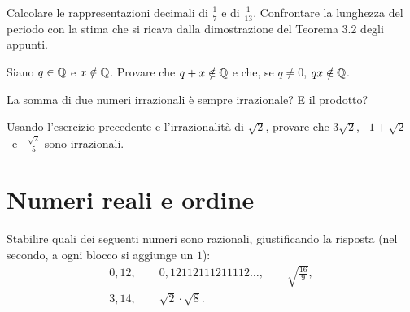 \begin{esercizio}[\liv{2}]
Calcolare le rappresentazioni decimali di $\frac17$ e di $\frac{1}{13}$. Confrontare la lunghezza del periodo con la stima che si ricava dalla dimostrazione del Teorema 3.2 degli appunti.
\end{esercizio}

\begin{esercizio}[\liv{2}]
Siano $q\in\mathbb Q$ e $x\notin\mathbb Q$. Provare che $q+x\notin\mathbb Q$ e che, se $q\ne0$, $qx\notin\mathbb Q$.
\end{esercizio}

\begin{esercizio}[\liv{2}]
La somma di due numeri irrazionali \`e sempre irrazionale? E il prodotto?
\end{esercizio}

\begin{esercizio}[\liv{2}]
Usando l'esercizio precedente e l'irrazionalità di $\sqrt2$, provare che $3\sqrt2$, \ $1+\sqrt2$ \ e \ $\frac{\sqrt2}{5}$ sono irrazionali.
\end{esercizio}

\section{Numeri reali e ordine}

\begin{esercizio}[\liv{1}]
Stabilire quali dei seguenti numeri sono razionali, giustificando la risposta (nel secondo, a ogni blocco si aggiunge un $1$):
\begin{gather*}
0{,}\overline{12},\qquad 0{,}12112111211112\ldots,\qquad \sqrt{\tfrac{16}{9}},\\
3{,}14,\qquad \sqrt2\cdot\sqrt8 .
\end{gather*}
\end{esercizio}

